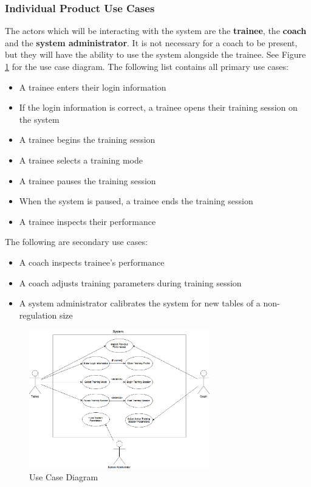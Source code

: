 \documentclass[11pt]{article}
\begin{document}
\subsubsection{Individual Product Use Cases}
The actors which will be interacting with the system are the \textbf{trainee}, the \textbf{coach} and the \textbf{system administrator}. It is not necessary for a coach to be present, but they will have the ability to use the system alongside the trainee. See Figure \ref{fig:usecase} for the use case diagram. The following list contains all primary use cases:
\begin{itemize}
\item A trainee enters their login information
\item If the login information is correct, a trainee opens their training session on the system
\item A trainee begins the training session
\item A trainee selects a training mode
\item A trainee pauses the training session
\item When the system is paused, a trainee ends the training session
\item A trainee inspects their performance
\end{itemize}
The following are secondary use cases:
\begin{itemize}
\item A coach inspects trainee's performance
\item A coach adjusts training parameters during training session
\item A system administrator calibrates the system for new tables of a non-regulation size
\end{itemize}

\begin{figure}[H]
   \centering
   \includegraphics[width=0.7\textwidth]{diagrams/UseCase.png}
   \caption{Use Case Diagram}
   \label{fig:usecase}
\end{figure}
\end{document}

